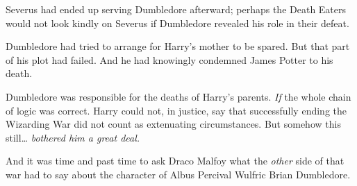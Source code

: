 Severus had ended up serving Dumbledore afterward; perhaps the Death
Eaters would not look kindly on Severus if Dumbledore revealed his role
in their defeat.

Dumbledore had tried to arrange for Harry's mother to be spared. But
that part of his plot had failed. And he had knowingly condemned James
Potter to his death.

Dumbledore was responsible for the deaths of Harry's parents. \emph{If}
the whole chain of logic was correct. Harry could not, in justice, say
that successfully ending the Wizarding War did not count as extenuating
circumstances. But somehow this still\ldots{} \emph{bothered him a great
deal.}

And it was time and past time to ask Draco Malfoy what the \emph{other}
side of that war had to say about the character of Albus Percival
Wulfric Brian Dumbledore.
